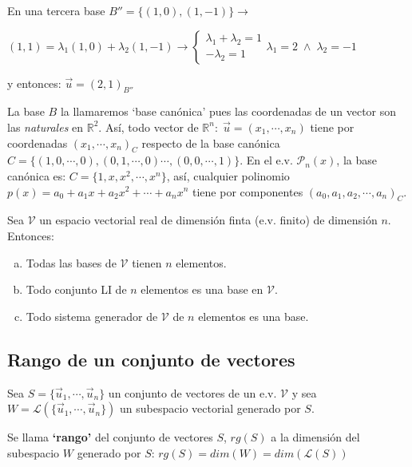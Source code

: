 En una tercera base $B''=\{(1,0),(1,-1)\} \to $

\noindent $(1,1) =  \lambda_1 (1,0) + \lambda_2 (1,-1) \to \begin{cases} \lambda_1 +\lambda_2=1 \\ -\lambda_2=1 \end{cases} \lambda_1=2\;\wedge \; \lambda_2=-1  $

\noindent y entonces: $\vec u=(2,1)_{B''}$

La base $B$ la llamaremos `base canónica' pues las coordenadas de un vector son las \emph{naturales} en $\mathbb R^2$. Así, todo vector de $\mathbb R^n:\; \vec u= (x_1, \cdots, x_n)$ tiene por coordenadas $(x_1, \cdots, x_n)_C$ respecto de la base canónica $C=\{(1,0,\cdots ,0),(0,1,\cdots, 0) \cdots , (0,0,\cdots ,1)\}$. En el e.v. $\mathcal P_n(x)$, la base canónica es: $C=\{ 1,x,x^2, \cdots, x^n\}$, así, cualquier polinomio $p(x)=a_0+a_1x+a_2x^2+ \cdots + a_nx^n$ tiene por componentes $(a_0,a_1,a_2, \cdots , a_n)_C$.

\begin{teor}
Sea $\mathcal V$ un espacio vectorial real de dimensión finta (e.v. finito) de dimensión $n$. Entonces:

\vspace{-4mm}
\begin{enumerate}[a) ]	
\item Todas las bases de $\mathcal V$ tienen $n$ elementos.
\item Todo conjunto LI de $n$ elementos es una base en $\mathcal V$.
\item Todo sistema generador de $\mathcal V$ de $n$ elementos es una base.	
\end{enumerate}

\end{teor}



\subsection{Rango de un conjunto de vectores}

\begin{defi}
Sea $S=\{ \vec u_1, \cdots , \vec u_n \}$ un conjunto de vectores de un e.v. $\mathcal V$ y sea $W=\mathcal L(\{ \vec u_1, \cdots , \vec u_n \})$ un subespacio vectorial generado por $S$.

Se llama \textbf{`rango'} del conjunto de vectores $S$, $rg(S)$ a la dimensión del subespacio $W$ generado por $S$: $rg(S)=dim(W)=dim(\mathcal L(S))$
\end{defi}

